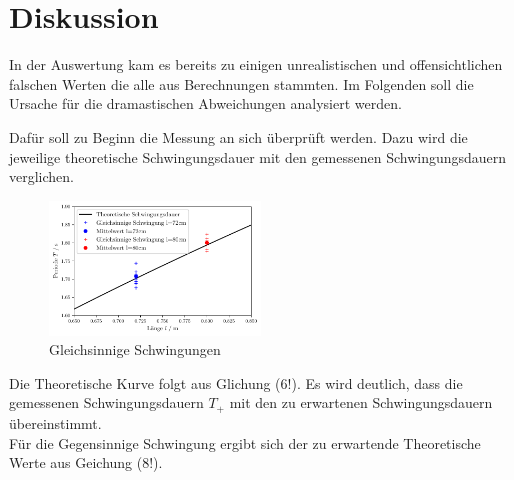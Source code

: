 \section{Diskussion}
\label{sec:Diskussion}

In der Auswertung kam es bereits zu einigen unrealistischen und offensichtlichen
falschen Werten die alle aus Berechnungen stammten.
Im Folgenden soll die Ursache für die dramastischen Abweichungen analysiert werden.


Dafür soll zu Beginn die Messung an sich überprüft werden.
Dazu wird die jeweilige theoretische Schwingungsdauer mit den gemessenen Schwingungsdauern verglichen.
\begin{figure}
    \centering
    \includegraphics[width=0.5\textwidth]{plots/plot1.pdf}
    \caption{Gleichsinnige Schwingungen}
\end{figure}
Die Theoretische Kurve folgt aus Glichung (6!). Es wird deutlich, dass die gemessenen
Schwingungsdauern $T_+$ mit den zu erwartenen Schwingungsdauern übereinstimmt.\\

Für die Gegensinnige Schwingung ergibt sich der zu erwartende Theoretische Werte aus Geichung (8!).

